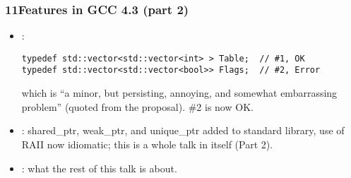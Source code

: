 
\begin{frame}[fragile,t]
\frametitle{\CC11Features in GCC 4.3 (part 2)}

\begin{itemize}

\item{} :
{\scriptsize
\begin{verbatim}
typedef std::vector<std::vector<int> > Table;  // #1, OK
typedef std::vector<std::vector<bool>> Flags;  // #2, Error
\end{verbatim}
}
which is ``a minor, but persisting, annoying, and somewhat
embarrassing problem'' (quoted from the proposal). \#2 is now OK.

\vskip 12pt

\item{} : shared\_ptr, weak\_ptr, and unique\_ptr added to
standard library, use of RAII now idiomatic; this is a whole talk in
itself (Part 2).

\vskip 12pt
\item{} : what the rest of this talk
is about.



\end{itemize}

\end{frame}
